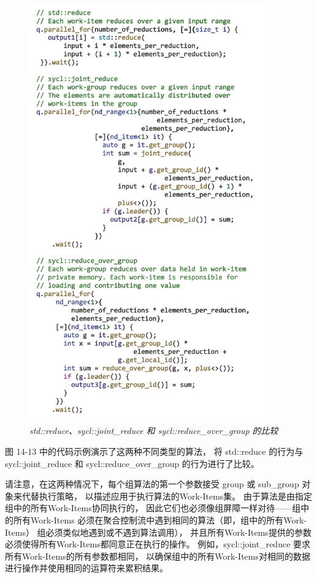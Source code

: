 \begin{figure}[H]
	\centering
	\includegraphics[width=0.9\textwidth]{figs/F14.13.png}
	\caption{\textit{std::reduce、sycl::joint\_reduce 和 sycl::reduce\_over\_group 的比较 }}
\end{figure}

图 14-13 中的代码示例演示了这两种不同类型的算法，
将 std::reduce 的行为与 sycl::joint\_reduce 和 sycl::reduce\_over\_group 的行为进行了比较。

请注意，在这两种情况下，每个组算法的第一个参数接受 group 或 sub\_group 对象来代替执行策略，
以描述应用于执行算法的Work-Items集。 
由于算法是由指定组中的所有Work-Items协同执行的，
因此它们也必须像组屏障一样对待——组中的所有Work-Items
必须在聚合控制流中遇到相同的算法（即，组中的所有Work-Items） 组必须类似地遇到或不遇到算法调用），
并且所有Work-Items提供的参数必须使得所有Work-Items都同意正在执行的操作。 
例如，sycl::joint\_reduce 要求所有Work-Items的所有参数都相同，
以确保组中的所有Work-Items对相同的数据进行操作并使用相同的运算符来累积结果。

